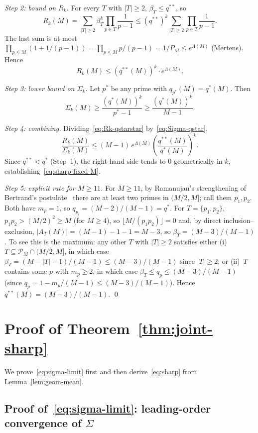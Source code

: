 \documentclass[11pt]{article}
\theoremstyle{remark}
\newcommand{\PM}{\mathcal{P}_M}
\begin{document}
\emph{Step 2: bound on $R_k$.} For every $T$ with $|T| \geq 2$, $\beta_T \leq q^{**}$, so
\[
R_k(M) = \sum_{|T| \geq 2}\beta_T^k \prod_{p \in T}\frac{1}{p-1} \leq (q^{**})^k \sum_{|T| \geq 2}\prod_{p \in T}\frac{1}{p-1}.
\]
The last sum is at most $\prod_{p \leq M}(1 + 1/(p-1)) = \prod_{p \leq M}p/(p-1) = 1/P_M \leq e^{\Lambda(M)}$ (Mertens). Hence
\begin{equation}\label{eq:Rk-qstarstar}
R_k(M) \leq (q^{**}(M))^k \cdot e^{\Lambda(M)}.
\end{equation}

\emph{Step 3: lower bound on $\Sigma_k$.} Let $p^*$ be any prime with $q_{p^*}(M) = q^*(M)$. Then
\begin{equation}\label{eq:Sigma-qstar}
\Sigma_k(M) \geq \frac{(q^*(M))^k}{p^* - 1} \geq \frac{(q^*(M))^k}{M-1}.
\end{equation}

\emph{Step 4: combining.} Dividing~\eqref{eq:Rk-qstarstar} by~\eqref{eq:Sigma-qstar},
\[
\frac{R_k(M)}{\Sigma_k(M)} \leq (M-1)\, e^{\Lambda(M)}\left(\frac{q^{**}(M)}{q^*(M)}\right)^{\!k}.
\]
Since $q^{**} < q^*$ (Step~1), the right-hand side tends to $0$ geometrically in $k$, establishing~\eqref{eq:sharp-fixed-M}.

\emph{Step 5: explicit rate for $M \geq 11$.} For $M \geq 11$, by Ramanujan's strengthening of Bertrand's postulate~\cite{Ramanujan1919} there are at least two primes in $(M/2, M]$; call them $p_1, p_2$. Both have $m_p = 1$, so $q_{p_i} = (M-2)/(M-1) = q^*$. For $T = \{p_1, p_2\}$, $p_1 p_2 > (M/2)^2 \geq M$ (for $M \geq 4$), so $\lfloor M/(p_1 p_2)\rfloor = 0$ and, by direct inclusion--exclusion, $|A_T(M)| = (M-1)-1-1 = M-3$, so $\beta_T = (M-3)/(M-1)$. To see this is the maximum: any other $T$ with $|T| \geq 2$ satisfies either (i)~$T \subseteq \PM \cap (M/2, M]$, in which case $\beta_T = (M - |T| - 1)/(M-1) \leq (M-3)/(M-1)$ since $|T| \geq 2$; or (ii)~$T$ contains some $p$ with $m_p \geq 2$, in which case $\beta_T \leq q_p \leq (M-3)/(M-1)$ (since $q_p = 1 - m_p/(M-1) \leq (M-3)/(M-1)$). Hence $q^{**}(M) = (M-3)/(M-1)$.
\qed

\section{Proof of Theorem~\ref{thm:joint-sharp}}\label{sec:thm4}

We prove~\eqref{eq:sigma-limit} first and then derive~\eqref{eq:sharp} from Lemma~\ref{lem:geom-mean}.

\subsection[Leading-order convergence of Sigma]{Proof of~\eqref{eq:sigma-limit}: leading-order convergence of $\Sigma$}\label{sec:thm4-leading}
\end{document}
